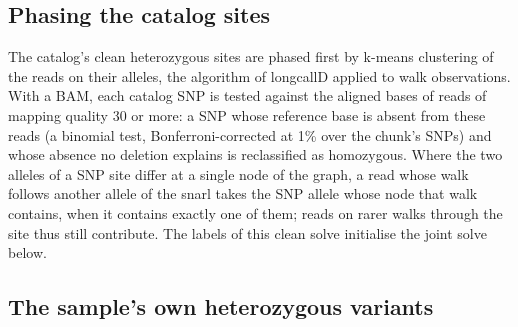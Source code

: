 \subsection{Phasing the catalog sites}

The catalog's clean heterozygous sites are phased first by k-means clustering of the reads on their alleles, the algorithm of longcallD \citep{Gao2026} applied to walk observations. With a BAM, each catalog SNP is tested against the aligned bases of reads of mapping quality 30 or more: a SNP whose reference base is absent from these reads (a binomial test, Bonferroni-corrected at 1\% over the chunk's SNPs) and whose absence no deletion explains is reclassified as homozygous. Where the two alleles of a SNP site differ at a single node of the graph, a read whose walk follows another allele of the snarl takes the SNP allele whose node that walk contains, when it contains exactly one of them; reads on rarer walks through the site thus still contribute. The labels of this clean solve initialise the joint solve below.

\subsection{The sample's own heterozygous variants}

